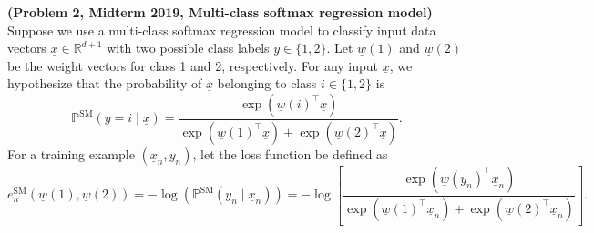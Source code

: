 \documentclass{article}
\newcommand{\probP}{\mathds{P}}
\theoremstyle{definition}
\newtheorem*{answer}{Answer}
\begin{document}
\begin{question}[start=0]
	\item \textbf{(Problem 2, Midterm 2019, Multi-class softmax regression model)}
	Suppose we use a multi-class softmax regression model to classify input data vectors $\underline{x} \in \mathbb{R}^{d+1}$ with two possible class labels $y \in \{1, 2\}$. Let $\underline{w}(1)$ and $\underline{w}(2)$ be the weight vectors for class 1 and 2, respectively. For any input $\underline{x}$, we hypothesize that the probability of $\underline{x}$ belonging to class $i \in \{1, 2\}$ is
	\[
	\probP^{\text{SM}}(y = i\mid \underline{x}) = \frac{\exp(\underline{w}(i)^\top \underline{x})}{\exp(\underline{w}(1)^\top \underline{x}) + \exp(\underline{w}(2)^\top \underline{x})}.
	\]
	For a training example $(\underline{x}_n, y_n)$, let the loss function be defined as
	\[
	e^{\text{SM}}_{n}(\underline{w}(1), \underline{w}(2)) = -\log(\probP^{\text{SM}}(y_n\mid \underline{x}_n)) = -\log\left[\frac{\exp(\underline{w}(y_n)^\top \underline{x}_n)}{\exp(\underline{w}(1)^\top\underline{x}_n) + \exp(\underline{w}(2)^\top\underline{x}_n)}\right].
	\]
	\begin{question}

\end{question}
\end{question}
\end{document}
